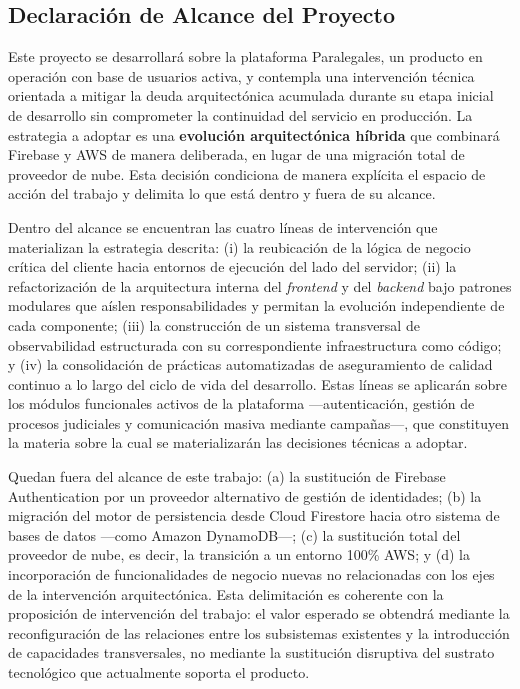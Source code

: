 \subsection{Declaración de Alcance del Proyecto}

Este proyecto se desarrollará sobre la plataforma Paralegales, un producto en operación con base de usuarios activa, y contempla una intervención técnica orientada a mitigar la deuda arquitectónica acumulada durante su etapa inicial de desarrollo sin comprometer la continuidad del servicio en producción. La estrategia a adoptar es una \textbf{evolución arquitectónica híbrida} que combinará Firebase y AWS de manera deliberada, en lugar de una migración total de proveedor de nube. Esta decisión condiciona de manera explícita el espacio de acción del trabajo y delimita lo que está dentro y fuera de su alcance.

Dentro del alcance se encuentran las cuatro líneas de intervención que materializan la estrategia descrita: (i) la reubicación de la lógica de negocio crítica del cliente hacia entornos de ejecución del lado del servidor; (ii) la refactorización de la arquitectura interna del \textit{frontend} y del \textit{backend} bajo patrones modulares que aíslen responsabilidades y permitan la evolución independiente de cada componente; (iii) la construcción de un sistema transversal de observabilidad estructurada con su correspondiente infraestructura como código; y (iv) la consolidación de prácticas automatizadas de aseguramiento de calidad continuo a lo largo del ciclo de vida del desarrollo. Estas líneas se aplicarán sobre los módulos funcionales activos de la plataforma —autenticación, gestión de procesos judiciales y comunicación masiva mediante campañas—, que constituyen la materia sobre la cual se materializarán las decisiones técnicas a adoptar.

Quedan fuera del alcance de este trabajo: (a) la sustitución de Firebase Authentication por un proveedor alternativo de gestión de identidades; (b) la migración del motor de persistencia desde Cloud Firestore hacia otro sistema de bases de datos —como Amazon DynamoDB—; (c) la sustitución total del proveedor de nube, es decir, la transición a un entorno 100\% AWS; y (d) la incorporación de funcionalidades de negocio nuevas no relacionadas con los ejes de la intervención arquitectónica. Esta delimitación es coherente con la proposición de intervención del trabajo: el valor esperado se obtendrá mediante la reconfiguración de las relaciones entre los subsistemas existentes y la introducción de capacidades transversales, no mediante la sustitución disruptiva del sustrato tecnológico que actualmente soporta el producto.
